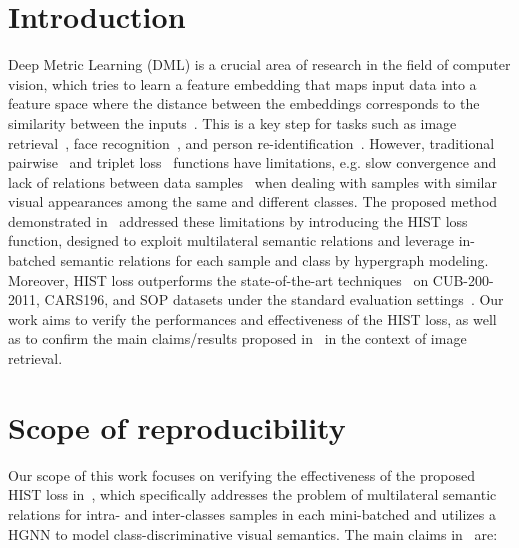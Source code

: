 \section{Introduction}
Deep Metric Learning (DML) is a crucial area of research in the field of computer vision, which tries to learn a feature embedding that maps input data into a feature space where the distance between the embeddings corresponds to the similarity between the inputs~\cite{xing2002distance,weinberger2009distance}. This is a key step for tasks such as image retrieval~\cite{feng2018hypergraph,wang2019multi,movshovitz2017no}, face recognition~\cite{schroff2015facenet,sun2014deep,liu2017sphereface}, and person re-identification~\cite{chen2017beyond,xiao2017joint,filkovic2016deep}. However, traditional pairwise~\cite{sohn2016improved} and triplet loss~\cite{hoffer2015deep} functions have limitations, e.g. slow convergence and lack of relations between data samples~\cite{sohn2016improved} when dealing with samples with similar visual appearances among the same and different classes. The proposed method demonstrated in~\cite{lim2022hypergraph} addressed these limitations by introducing the HIST loss function, designed to exploit multilateral semantic relations and leverage in-batched semantic relations for each sample and class by hypergraph modeling. Moreover, HIST loss outperforms the state-of-the-art techniques~\cite{zhu2020fewer,xu2021discrimination,zheng2021deep} on CUB-200-2011, CARS196, and SOP datasets under the standard evaluation settings~\cite{kim2020proxy,oh2016deep,qian2019softtriple, wang2019multi}. Our work aims to verify the performances and effectiveness of the HIST loss, as well as to confirm the main claims/results proposed in~\cite{lim2022hypergraph} in the context of image retrieval.

\section{Scope of reproducibility\label{claim5}}

Our scope of this work focuses on verifying the effectiveness of the proposed HIST loss in~\cite{lim2022hypergraph}, which specifically addresses the problem of multilateral semantic relations for intra- and inter-classes samples in each mini-batched and utilizes a HGNN to model class-discriminative visual semantics. The main claims in~\cite{lim2022hypergraph} are:

